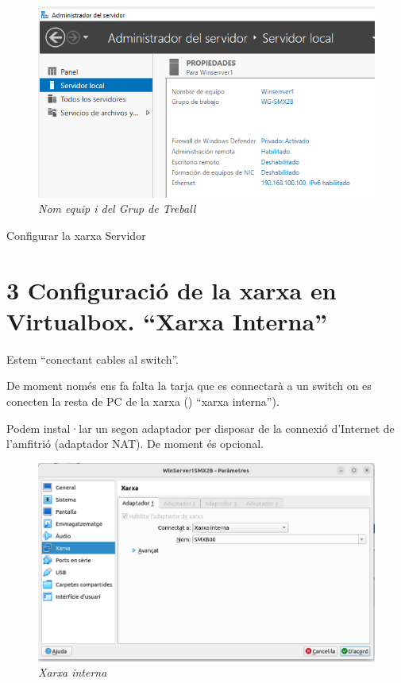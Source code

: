 \documentclass[
  a4paper,
]{article}
\begin{document}
\begin{figure}
\centering
\includegraphics{png/ADDS/WorkgroupNomEquip.png}
\caption{\emph{Nom equip i del Grup de Treball}}
\end{figure}

Configurar la xarxa Servidor

\section{3 Configuració de la xarxa en Virtualbox. ``Xarxa
Interna''}\label{configuraciuxf3-de-la-xarxa-en-virtualbox.-xarxa-interna}

Estem ``conectant cables al switch''.

De moment només ens fa falta la tarja que es connectarà a un switch on
es conecten la resta de PC de la xarxa () ``xarxa interna'').

Podem instal·lar un segon adaptador per disposar de la connexió
d'Internet de l'amfitrió (adaptador NAT). De moment és opcional.

\begin{figure}
\centering
\includegraphics{png/ADDS/xarxainterna.png}
\caption{\emph{Xarxa interna}}
\end{figure}
\end{document}
